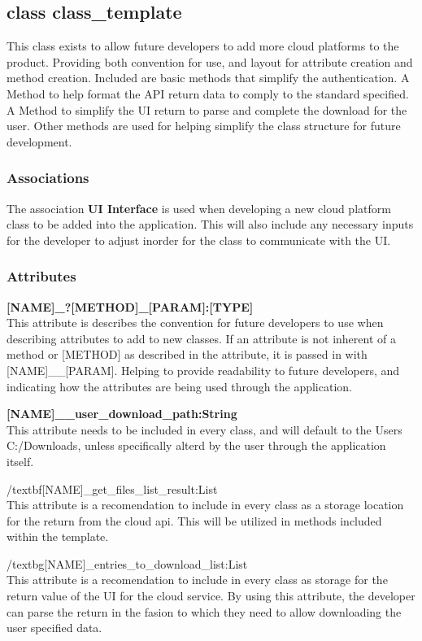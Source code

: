 \subsection{class class\_template}
This class exists to allow future developers to add more cloud platforms to the product. Providing both convention for use, and layout 
for attribute creation and method creation. Included are basic methods that simplify the authentication. A Method to help format the 
API return data to comply to the standard specified. A Method to simplify the UI return to parse and complete the download for the user.
Other methods are used for helping simplify the class structure for future development. 

\subsubsection{Associations}
The association \textbf{UI Interface} is used when developing a new cloud platform class to be added into the application. This will also 
include any necessary inputs for the developer to adjust inorder for the class to communicate with the UI. 

\subsubsection{Attributes}
\textbf{[NAME]\_?[METHOD]\_[PARAM]:[TYPE]} \\
This attribute is describes the convention for future developers to use when describing attributes to add to new classes. 
If an attribute is not inherent of a method or [METHOD] as described in the attribute, it is passed in with [NAME]\_\_[PARAM].
Helping to provide readability to future developers, and indicating how the attributes are being used through the application.

\textbf{[NAME]\_\_user\_download\_path:String} \\
This attribute needs to be included in every class, and will default to the Users C:/Downloads, unless specifically alterd by the user 
through the application itself. 

/textbf{[NAME]\_get\_files\_list\_result:List} \\
This attribute is a recomendation to include in every class as a storage location for the return from the cloud api. This will be 
utilized in methods included within the template. 

/textbg{[NAME]\_entries\_to\_download\_list:List} \\
This attribute is a recomendation to include in every class as storage for the return value of the UI for the cloud service. By using
this attribute, the developer can parse the return in the fasion to which they need to allow downloading the user specified data.

